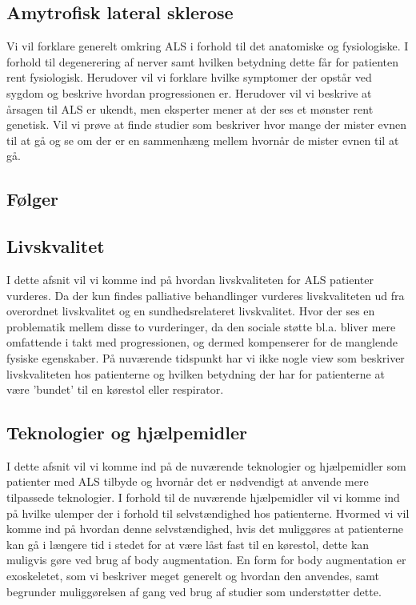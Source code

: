 \subsection{Amytrofisk lateral sklerose}
Vi vil forklare generelt omkring ALS i forhold til det anatomiske og fysiologiske. I forhold til degenerering af nerver samt hvilken betydning dette får for patienten rent fysiologisk. Herudover vil vi forklare hvilke symptomer der opstår ved sygdom og beskrive hvordan progressionen er. Herudover vil vi beskrive at årsagen til ALS er ukendt, men eksperter mener at der ses et mønster rent genetisk. Vil vi prøve at finde studier som beskriver hvor mange der  mister evnen til at gå og se om der er en sammenhæng mellem hvornår de mister evnen til at gå. 

\subsection{Følger}


\subsection{Livskvalitet}
I dette afsnit vil vi komme ind på hvordan livskvaliteten for ALS patienter vurderes. Da der kun findes palliative behandlinger vurderes livskvaliteten ud fra overordnet livskvalitet og en sundhedsrelateret livskvalitet. Hvor der ses en problematik mellem disse to vurderinger, da den sociale støtte bl.a. bliver mere omfattende i takt med progressionen, og dermed kompenserer for de manglende fysiske egenskaber. På nuværende tidspunkt har vi ikke nogle view som beskriver livskvaliteten hos patienterne og hvilken betydning der har for patienterne at være 'bundet' til en kørestol eller respirator. 

\subsection{Teknologier og hjælpemidler}
I dette afsnit vil vi komme ind på de nuværende teknologier og hjælpemidler som patienter med ALS tilbyde og hvornår det er nødvendigt at anvende mere tilpassede teknologier. I forhold til de nuværende hjælpemidler vil vi komme ind på hvilke ulemper der i forhold til selvstændighed hos patienterne. Hvormed vi vil komme ind på hvordan denne selvstændighed, hvis det muliggøres at patienterne kan gå i længere tid i stedet for at være låst fast til en kørestol, dette kan muligvis gøre ved brug af body augmentation. En form for body augmentation er exoskeletet, som vi beskriver meget generelt og hvordan den anvendes, samt begrunder muliggørelsen af gang ved brug af studier som understøtter dette. 

